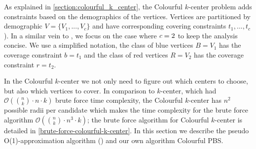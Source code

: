 As explained in \cref{section:colourful_k_center}, the Colourful $k$-center problem adds constraints based on the demographics of the vertices. Vertices are partitioned by demographic $V=\{V_1,...,V_c\}$ and have corresponding covering constraints $t_1,...,t_c$). In a similar vein to \textcite{bandyapadhyay_constant_2019}, we focus on the case where $\emph{c}=2$ to keep the analysis concise. We use a simplified notation, the class of blue vertices $B=V_1$ has the coverage constraint $b=t_1$ and the class of red vertices $R=V_2$ has the coverage constraint $r=t_2$. 

In the Colourful $k$-center we not only need to figure out which centers to choose, but also which vertices to cover. In comparison to $k$-center, which had $\mathcal{O}(\binom{n}{k}\cdot n\cdot k)$ brute force time complexity, the Colourful $k$-center has $n^2$ possible radii per candidate which makes the time complexity for the brute force algorithm $\mathcal{O}(\binom{n}{k}\cdot n^3\cdot k)$; the brute force algorithm for Colourful $k$-center is detailed in \cref{brute-force-colourful-k-center}. In this section we describe the pseudo O(1)-approximation algorithm (\cite{bandyapadhyay_constant_2019}) and our own algorithm Colourful PBS.